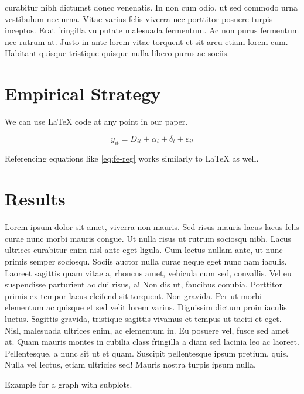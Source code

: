 \documentclass[
  12pt,
]{article}
\begin{document}
curabitur nibh dictumst donec venenatis. In non cum odio, ut sed commodo urna vestibulum nec urna. Vitae varius felis viverra nec porttitor posuere turpis inceptos. Erat fringilla vulputate malesuada fermentum. Ac non purus fermentum nec rutrum at. Justo in ante lorem vitae torquent et sit arcu etiam lorem cum. Habitant quisque tristique quisque nulla libero purus ac sociis.

\hypertarget{strat}{%
\section{Empirical Strategy}\label{strat}}

We can use LaTeX code at any point in our paper.

\begin{equation}
y_{it} = D_{it} + \alpha_i + \delta_t + \varepsilon_{it} \label{eq:fe-reg}
\end{equation}

Referencing equations like \eqref{eq:fe-reg} works similarly to LaTeX as well.

\hypertarget{res}{%
\section{Results}\label{res}}

Lorem ipsum dolor sit amet, viverra non mauris. Sed risus mauris lacus lacus felis curae nunc morbi mauris congue. Ut nulla risus ut rutrum sociosqu nibh. Lacus ultrices curabitur enim nisl ante eget ligula. Cum lectus nullam ante, ut nunc primis semper sociosqu. Sociis auctor nulla curae neque eget nunc nam iaculis. Laoreet sagittis quam vitae a, rhoncus amet, vehicula cum sed, convallis. Vel eu suspendisse parturient ac dui risus, a! Non dis ut, faucibus conubia. Porttitor primis ex tempor lacus eleifend sit torquent. Non gravida. Per ut morbi elementum ac quisque et sed velit lorem varius. Dignissim dictum proin iaculis luctus. Sagittis gravida, tristique sagittis vivamus et tempus ut taciti et eget. Nisl, malesuada ultrices enim, ac elementum in. Eu posuere vel, fusce sed amet at. Quam mauris montes in cubilia class fringilla a diam sed lacinia leo ac laoreet. Pellentesque, a nunc sit ut et quam. Suscipit pellentesque ipsum pretium, quis. Nulla vel lectus, etiam ultricies sed! Mauris nostra turpis ipsum nulla.

Example for a graph with subplots.
\end{document}
